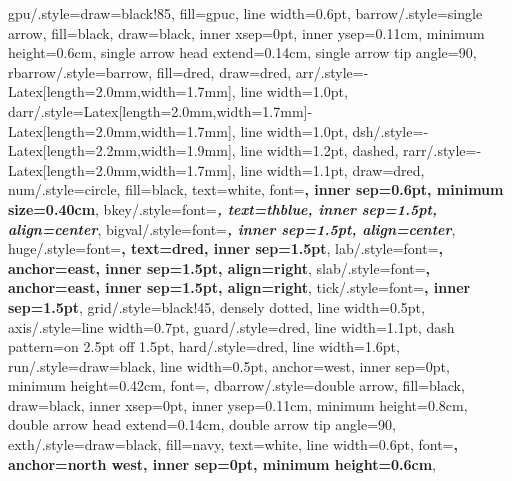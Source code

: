 {  gpu/.style={draw=black!85, fill=gpuc, line width=0.6pt},
  barrow/.style={single arrow, fill=black, draw=black, inner xsep=0pt, inner ysep=0.11cm, minimum height=0.6cm,
                 single arrow head extend=0.14cm, single arrow tip angle=90},
  rbarrow/.style={barrow, fill=dred, draw=dred},
  arr/.style={-{Latex[length=2.0mm,width=1.7mm]}, line width=1.0pt},
  darr/.style={{Latex[length=2.0mm,width=1.7mm]}-{Latex[length=2.0mm,width=1.7mm]}, line width=1.0pt},
  dsh/.style={-{Latex[length=2.2mm,width=1.9mm]}, line width=1.2pt, dashed},
  rarr/.style={-{Latex[length=2.0mm,width=1.7mm]}, line width=1.1pt, draw=dred},
  num/.style={circle, fill=black, text=white, font=\sffamily\bfseries\scriptsize, inner sep=0.6pt, minimum size=0.40cm},  %
  bkey/.style={font=\rmfamily\bfseries\itshape\footnotesize, text=thblue, inner sep=1.5pt, align=center},
  bigval/.style={font=\rmfamily\bfseries\itshape\small, inner sep=1.5pt, align=center},
  huge/.style={font=\rmfamily\bfseries\LARGE, text=dred, inner sep=1.5pt},
  lab/.style={font=\rmfamily\bfseries\footnotesize, anchor=east, inner sep=1.5pt, align=right},
  slab/.style={font=\rmfamily\bfseries\scriptsize, anchor=east, inner sep=1.5pt, align=right},
  tick/.style={font=\rmfamily\bfseries\scriptsize, inner sep=1.5pt},
  grid/.style={black!45, densely dotted, line width=0.5pt},
  axis/.style={line width=0.7pt},
  guard/.style={dred, line width=1.1pt, dash pattern=on 2.5pt off 1.5pt},
  hard/.style={dred, line width=1.6pt},
  run/.style={draw=black, line width=0.5pt, anchor=west, inner sep=0pt, minimum height=0.42cm, font=\rmfamily\bfseries\scriptsize},
  dbarrow/.style={double arrow, fill=black, draw=black, inner xsep=0pt, inner ysep=0.11cm, minimum height=0.8cm,
                  double arrow head extend=0.14cm, double arrow tip angle=90},
  exth/.style={draw=black, fill=navy, text=white, line width=0.6pt, font=\rmfamily\bfseries\normalsize, anchor=north west,
               inner sep=0pt, minimum height=0.6cm},
}
